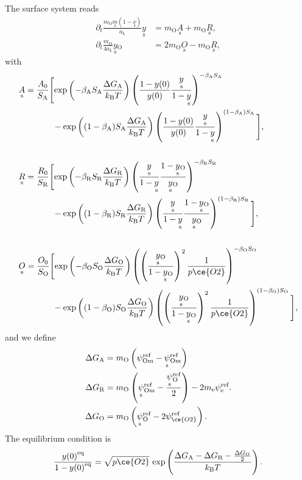 \documentclass{article}
\numberwithin{equation}{section}
\newcommand{\us}[1]{\underset{\textrm{s}}{#1}{}}
\def\kB{k_\mathrm{B}}
\def\Ox{\mathrm{O}}
\newcommand{\OO}{{\ce{O2}}}
\def\aL{a_\mathrm{L}}
\def\ys{\us y}
\def\y0{{y(0)}}
\def\yOs{{\us y_\textrm{O}}}
\def\pO2{{p\OO}}
\def\A0{A_0}
\def\R0{R_0}
\def\K0{O_0}
\def\DGA{\Delta G_\textrm{A}  }
\def\DGR{\Delta G_\textrm{R}  }
\def\DGO{\Delta G_\textrm{O}  }
\def\betaA{\beta_\textrm{A}}
\def\betaR{\beta_\textrm{R}}
\def\betaO{\beta_\textrm{O}}
\def\SA{S_\textrm{A}}
\def\SR{S_\textrm{R}}
\def\SO{S_\textrm{O}}
\def\eq{\textrm{eq}}
\def\REF{\textrm{ref}}
\begin{document}
The surface system reads
\begin{subequations}
\begin{align}
\partial_t \frac{m_\Ox \us m (1- \us \nu)}{\aL} \ys
&=
m_\Ox \us A
+
m_\Ox \us R,
\\
\partial_t \frac{m_\Ox}{4 \aL} \yOs
&=
2 m_\Ox \us O
-
m_\Ox \us R,
\end{align}
\end{subequations}
with
\begin{subequations}
\begin{align}
&\us A
=
\frac{\A0}{\SA}
\Bigg[
	\textrm{exp}
	\left(
		{-\betaA \SA \frac{\DGA}{\kB T}}
	\right)
	\left(
		\frac{1 - \y0}{\y0}
		\frac{\ys}{1-\ys}
	\right)^{-\betaA \SA}
\\ \nonumber
	&\quad \quad \quad \quad	
	-
	\textrm{exp}
	\left(
		{(1-\betaA) \SA \frac{\DGA}{\kB T}}
	\right)
	\left(
		\frac{1 - \y0}{\y0}
		\frac{\ys}{1-\ys}
	\right)^{(1-\betaA) \SA}
\Bigg],
\\ \nonumber
\\
&\us R
=
\frac{\R0}{\SR}
\Bigg[
	\textrm{exp}
	\left(
		{-\betaR \SR \frac{\DGR}{\kB T}}
	\right)
	\left(
		\frac{\ys}{1- \ys}
		\frac{1-\yOs}{\yOs}
	\right)^{-\betaR \SR}
\\ \nonumber
	& \quad \quad \quad \quad	
	-
	\textrm{exp}
	\left(
		{(1 - \betaR) \SR \frac{\DGR}{\kB T}}
	\right)
	\left(
		\frac{\ys}{1- \ys}
		\frac{1-\yOs}{\yOs}
	\right)^{(1-\betaR) \SR}
\Bigg],
\\ \nonumber
\\
&\us O
=
\frac{\K0}{\SO}
\Bigg[
	\textrm{exp}
	\left(
		{-\betaO \SO \frac{\DGO}{\kB T}}
	\right)
	\left(
		\left(
			\frac{\yOs}{1-\yOs}
		\right)^2
		\frac{1}{\pO2}
	\right)^{-\betaO \SO}
\\ \nonumber
	&\quad \quad \quad \quad	
	-
	\textrm{exp}
	\left(
		{(1-\betaO) \SO \frac{\DGO}{\kB T}}
	\right)
	\left(
		\left(
			\frac{\yOs}{1-\yOs}
		\right)^2
		\frac{1}{\pO2}
	\right)^{(1 - \betaO) \SO}
\Bigg],
\end{align}
\end{subequations}
and we define
\begin{subequations}
\begin{align}
\DGA
&=
m_\Ox
\left(
	\psi_{\textrm{Om}}^\REF
	-
	\us \psi_{\textrm{Om}}^\REF
\right)
\\
\DGR
&= 
m_\Ox
\left(
	\us \psi_{\textrm{Om}}^\REF
	-
	\frac{\us \psi_{\Ox}^\REF}{2}
\right)
-
2 m_\textrm{e} \psi_{\textrm{e}}^\REF.
\\
\DGO
&= 
m_\Ox
\left(
	\us \psi_{\Ox}^\REF
	-
	2 \psi_{\OO}^\REF
\right).
\end{align}
\end{subequations}
The equilibrium condition is
\begin{subequations}
\begin{align}
\frac{\y0^\eq}{1-\y0^\eq} = \sqrt{\pO2} \ \textrm{exp}
\left(
	\frac{\DGA - \DGR - \frac{\DGO}{2}}{\kB T}
\right).
\end{align}
\end{subequations}
\end{document}
